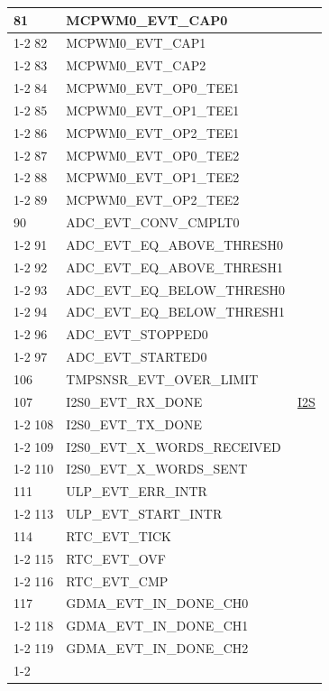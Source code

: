 \documentclass[main\_\_EN.tex]{subfiles}
\begin{document}
\begin{longtable}{ | l | l | l | }
81  & MCPWM0\_EVT\_CAP0   & \\ \cline{1-2}
82  & MCPWM0\_EVT\_CAP1   & \\ \cline{1-2}
83  & MCPWM0\_EVT\_CAP2   & \\ \cline{1-2}
84  & MCPWM0\_EVT\_OP0\_TEE1   & \\ \cline{1-2}
85  & MCPWM0\_EVT\_OP1\_TEE1   & \\ \cline{1-2}
86  & MCPWM0\_EVT\_OP2\_TEE1   & \\ \cline{1-2}
87  & MCPWM0\_EVT\_OP0\_TEE2   & \\ \cline{1-2}
88  & MCPWM0\_EVT\_OP1\_TEE2   & \\ \cline{1-2}
89  & MCPWM0\_EVT\_OP2\_TEE2   & \\ \hline
90  & ADC\_EVT\_CONV\_CMPLT0    & \nameref{mod:adc}   \\ \cline{1-2}
91  & ADC\_EVT\_EQ\_ABOVE\_THRESH0     & \\ \cline{1-2}
92  & ADC\_EVT\_EQ\_ABOVE\_THRESH1     & \\ \cline{1-2}
93  & ADC\_EVT\_EQ\_BELOW\_THRESH0     & \\ \cline{1-2}
94  & ADC\_EVT\_EQ\_BELOW\_THRESH1     & \\ \cline{1-2}
96  & ADC\_EVT\_STOPPED0 & \\ \cline{1-2}
97  & ADC\_EVT\_STARTED0 & \\ \hline
106 & TMPSNSR\_EVT\_OVER\_LIMIT & \nameref{mod:tmpsen}  \\ \hline
107 & I2S0\_EVT\_RX\_DONE & \hyperref[mod:i2s]{I2S}   \\ \cline{1-2}
108 & I2S0\_EVT\_TX\_DONE & \\ \cline{1-2}
109 & I2S0\_EVT\_X\_WORDS\_RECEIVED     & \\ \cline{1-2}
110 & I2S0\_EVT\_X\_WORDS\_SENT  & \\ \hline
111 & ULP\_EVT\_ERR\_INTR  & \nameref{mod:ulp}   \\ \cline{1-2}
113 & ULP\_EVT\_START\_INTR& \\ \hline
114 & RTC\_EVT\_TICK     & \nameref{mod:rtctimer}   \\ \cline{1-2}
115 & RTC\_EVT\_OVF      & \\ \cline{1-2}
116 & RTC\_EVT\_CMP      & \\ \hline
117 & GDMA\_EVT\_IN\_DONE\_CH0  &  \nameref{mod:dma} \\ \cline{1-2}
118 & GDMA\_EVT\_IN\_DONE\_CH1  & \\ \cline{1-2}
119 & GDMA\_EVT\_IN\_DONE\_CH2  & \\ \cline{1-2}

\end{longtable}
\end{document}

